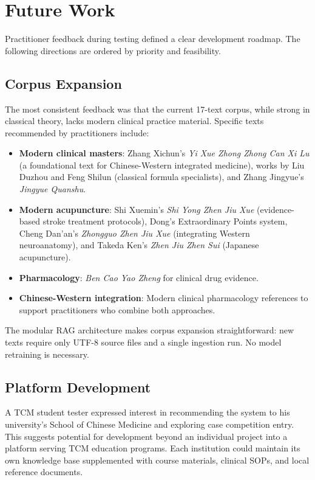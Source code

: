 \section{Future Work}

Practitioner feedback during testing defined a clear development roadmap. The following directions are ordered by priority and feasibility.

\subsection{Corpus Expansion}

The most consistent feedback was that the current 17-text corpus, while strong in classical theory, lacks modern clinical practice material. Specific texts recommended by practitioners include:

\begin{itemize}
    \item \textbf{Modern clinical masters}: Zhang Xichun's \textit{Yi Xue Zhong Zhong Can Xi Lu} (a foundational text for Chinese-Western integrated medicine), works by Liu Duzhou and Feng Shilun (classical formula specialists), and Zhang Jingyue's \textit{Jingyue Quanshu}.
    \item \textbf{Modern acupuncture}: Shi Xuemin's \textit{Shi Yong Zhen Jiu Xue} (evidence-based stroke treatment protocols), Dong's Extraordinary Points system, Cheng Dan'an's \textit{Zhongguo Zhen Jiu Xue} (integrating Western neuroanatomy), and Takeda Ken's \textit{Zhen Jiu Zhen Sui} (Japanese acupuncture).
    \item \textbf{Pharmacology}: \textit{Ben Cao Yao Zheng} for clinical drug evidence.
    \item \textbf{Chinese-Western integration}: Modern clinical pharmacology references to support practitioners who combine both approaches.
\end{itemize}

The modular RAG architecture makes corpus expansion straightforward: new texts require only UTF-8 source files and a single ingestion run. No model retraining is necessary.

\subsection{Platform Development}

A TCM student tester expressed interest in recommending the system to his university's School of Chinese Medicine and exploring case competition entry. This suggests potential for development beyond an individual project into a platform serving TCM education programs. Each institution could maintain its own knowledge base supplemented with course materials, clinical SOPs, and local reference documents.

